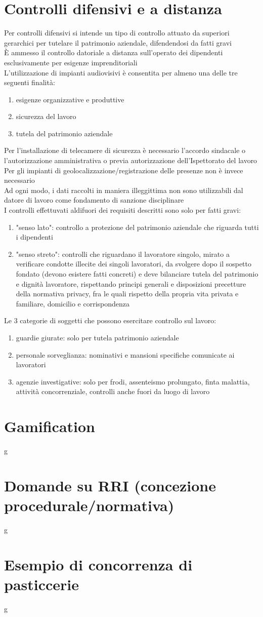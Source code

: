 \documentclass[8pt,oneside,a4paper]{article}
\begin{document}
	\section{Controlli difensivi e a distanza}
	Per controlli difensivi si intende un tipo di controllo attuato da superiori gerarchici per tutelare il patrimonio aziendale, difendendosi da fatti gravi\\
	È ammesso il controllo datoriale a distanza sull'operato dei dipendenti esclusivamente per esigenze imprenditoriali\\
	L'utilizzazione di impianti audiovisivi è consentita per almeno una delle tre seguenti finalità:
	\begin{enumerate}
		\item esigenze organizzative e produttive
		\item sicurezza del lavoro
		\item tutela del patrimonio aziendale
	\end{enumerate}
	Per l'installazione di telecamere di sicurezza è necessario l'accordo sindacale o l'autorizzazione amministrativa o previa autorizzazione dell'Ispettorato del lavoro\\
	Per gli impianti di geolocalizzazione/registrazione delle presenze non è invece necessario\\
	Ad ogni modo, i dati raccolti in maniera illeggittima non sono utilizzabili dal datore di lavoro come fondamento di sanzione disciplinare\\
	I controlli effettuvati aldifuori dei requisiti descritti sono solo per fatti gravi:
	\begin{enumerate}
		\item "senso lato": controllo a protezione del patrimonio aziendale che riguarda tutti i dipendenti
		\item "senso streto": controlli che riguardano il lavoratore singolo, mirato a verificare condotte illecite dei singoli lavoratori, da svolgere dopo il sospetto fondato (devono esistere fatti concreti) e deve bilanciare tutela del patrimonio e dignità lavoratore, rispettando principi generali e disposizioni precetture della normativa privacy, fra le quali rispetto della propria vita privata e familiare, domicilio e corrispondenza
	\end{enumerate}
	Le 3 categorie di soggetti che possono esercitare controllo sul lavoro:
	\begin{enumerate}
		\item guardie giurate: solo per tutela patrimonio aziendale
		\item personale sorveglianza: nominativi e mansioni specifiche comunicate ai lavoratori
		\item agenzie investigative: solo per frodi, assenteismo prolungato, finta malattia, attività concorrenziale, controlli anche fuori da luogo di lavoro
	\end{enumerate}
	
	\section{Gamification}
	g
	\section{Domande su RRI (concezione procedurale/normativa)}
	g
	\section{Esempio di concorrenza di pasticcerie}
	g
\end{document}
